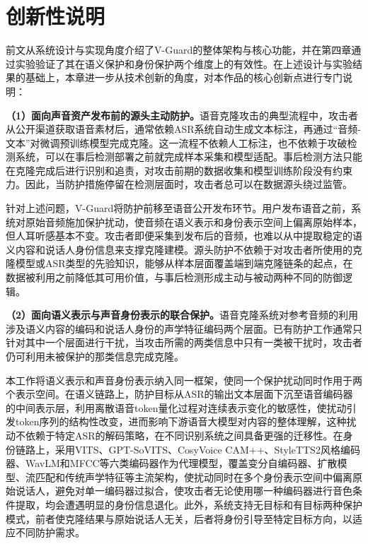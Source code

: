 \chapter{创新性说明}\label{ux7b2cux4e94ux7ae0-ux521bux65b0ux6027ux8bf4ux660e}

前文从系统设计与实现角度介绍了V-Guard的整体架构与核心功能，并在第四章通过实验验证了其在语义保护和身份保护两个维度上的有效性。在上述设计与实验结果的基础上，本章进一步从技术创新的角度，对本作品的核心创新点进行专门说明：

\textbf{（1）面向声音资产发布前的源头主动防护。}语音克隆攻击的典型流程中，攻击者从公开渠道获取语音素材后，通常依赖ASR系统自动生成文本标注，再通过``音频-文本''对微调预训练模型完成克隆。这一流程不依赖人工标注，也不依赖于攻破检测系统，可以在事后检测部署之前就完成样本采集和模型适配。事后检测方法只能在克隆完成后进行识别和追责，对攻击前期的数据收集和模型训练阶段没有约束力。因此，当防护措施停留在检测层面时，攻击者总可以在数据源头绕过监管。

针对上述问题，V-Guard将防护前移至语音公开发布环节。用户发布语音之前，系统对原始音频施加保护扰动，使音频在语义表示和身份表示空间上偏离原始样本，但人耳听感基本不变。攻击者即便采集到发布后的音频，也难以从中提取稳定的语义内容和说话人身份信息来支撑克隆建模。源头防护不依赖于对攻击者所使用的克隆模型或ASR类型的先验知识，能够从样本层面覆盖端到端克隆链条的起点，在数据被利用之前降低其可用价值，与事后检测形成主动与被动两种不同的防御逻辑。

\textbf{（2）面向语义表示与声音身份表示的联合保护。}语音克隆系统对参考音频的利用涉及语义内容的编码和说话人身份的声学特征编码两个层面。已有防护工作通常只针对其中一个层面进行干扰，当攻击所需的两类信息中只有一类被干扰时，攻击者仍可利用未被保护的那类信息完成克隆。

本工作将语义表示和声音身份表示纳入同一框架，使同一个保护扰动同时作用于两个表示空间。在语义链路上，防护目标从ASR的输出文本层面下沉至语音编码器的中间表示层，利用离散语音token量化过程对连续表示变化的敏感性，使扰动引发token序列的结构性改变，进而影响下游语音大模型对内容的整体理解，这种扰动不依赖于特定ASR的解码策略，在不同识别系统之间具备更强的迁移性。在身份链路上，采用VITS、GPT-SoVITS、CosyVoice
CAM++、StyleTTS2风格编码器、WavLM和MFCC等六类编码器作为代理模型，覆盖变分自编码器、扩散模型、流匹配和传统声学特征等主流架构，使扰动同时在多个身份表示空间中偏离原始说话人，避免对单一编码器过拟合，使攻击者无论使用哪一种编码器进行音色条件提取，均会遭遇明显的身份信息退化。此外，系统支持无目标和有目标两种保护模式，前者使克隆结果与原始说话人无关，后者将身份引导至特定目标方向，以适应不同防护需求。

